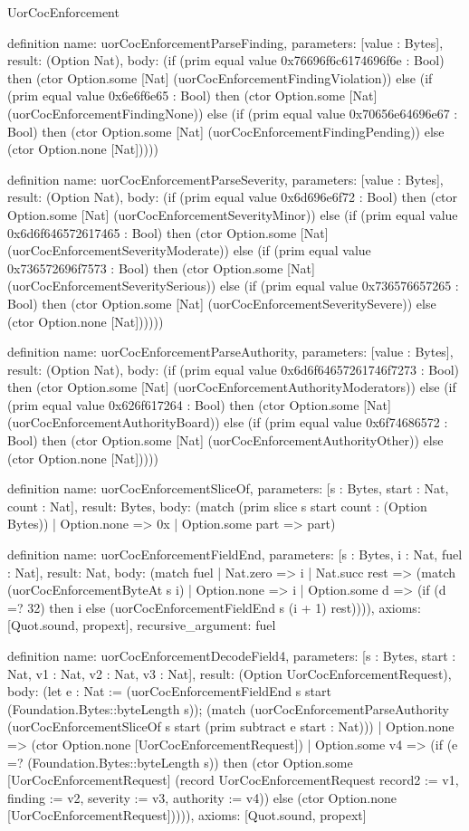 \begin{lexlean}{UorCocEnforcement}
\begin{semanticmodule}
definition{
  name: uorCocEnforcementParseFinding,
  parameters: [value : Bytes],
  result: (Option Nat),
  body: (if (prim equal value 0x76696f6c6174696f6e : Bool) then (ctor Option.some [Nat] (uorCocEnforcementFindingViolation)) else (if (prim equal value 0x6e6f6e65 : Bool) then (ctor Option.some [Nat] (uorCocEnforcementFindingNone)) else (if (prim equal value 0x70656e64696e67 : Bool) then (ctor Option.some [Nat] (uorCocEnforcementFindingPending)) else (ctor Option.none [Nat]))))
}

definition{
  name: uorCocEnforcementParseSeverity,
  parameters: [value : Bytes],
  result: (Option Nat),
  body: (if (prim equal value 0x6d696e6f72 : Bool) then (ctor Option.some [Nat] (uorCocEnforcementSeverityMinor)) else (if (prim equal value 0x6d6f646572617465 : Bool) then (ctor Option.some [Nat] (uorCocEnforcementSeverityModerate)) else (if (prim equal value 0x736572696f7573 : Bool) then (ctor Option.some [Nat] (uorCocEnforcementSeveritySerious)) else (if (prim equal value 0x736576657265 : Bool) then (ctor Option.some [Nat] (uorCocEnforcementSeveritySevere)) else (ctor Option.none [Nat])))))
}

definition{
  name: uorCocEnforcementParseAuthority,
  parameters: [value : Bytes],
  result: (Option Nat),
  body: (if (prim equal value 0x6d6f64657261746f7273 : Bool) then (ctor Option.some [Nat] (uorCocEnforcementAuthorityModerators)) else (if (prim equal value 0x626f617264 : Bool) then (ctor Option.some [Nat] (uorCocEnforcementAuthorityBoard)) else (if (prim equal value 0x6f74686572 : Bool) then (ctor Option.some [Nat] (uorCocEnforcementAuthorityOther)) else (ctor Option.none [Nat]))))
}

definition{
  name: uorCocEnforcementSliceOf,
  parameters: [s : Bytes, start : Nat, count : Nat],
  result: Bytes,
  body: (match (prim slice s start count : (Option Bytes))
    | Option.none => 0x
    | Option.some part => part)
}

definition{
  name: uorCocEnforcementFieldEnd,
  parameters: [s : Bytes, i : Nat, fuel : Nat],
  result: Nat,
  body: (match fuel
    | Nat.zero => i
    | Nat.succ rest => (match (uorCocEnforcementByteAt s i)
      | Option.none => i
      | Option.some d => (if (d =? 32) then i else (uorCocEnforcementFieldEnd s (i + 1) rest)))),
  axioms: [Quot.sound, propext],
  recursive_argument: fuel
}

definition{
  name: uorCocEnforcementDecodeField4,
  parameters: [s : Bytes, start : Nat, v1 : Nat, v2 : Nat, v3 : Nat],
  result: (Option UorCocEnforcementRequest),
  body: (let e : Nat := (uorCocEnforcementFieldEnd s start (Foundation.Bytes::byteLength s)); (match (uorCocEnforcementParseAuthority (uorCocEnforcementSliceOf s start (prim subtract e start : Nat)))
    | Option.none => (ctor Option.none [UorCocEnforcementRequest])
    | Option.some v4 => (if (e =? (Foundation.Bytes::byteLength s)) then (ctor Option.some [UorCocEnforcementRequest] (record UorCocEnforcementRequest {record2 := v1, finding := v2, severity := v3, authority := v4})) else (ctor Option.none [UorCocEnforcementRequest])))),
  axioms: [Quot.sound, propext]
}


\end{semanticmodule}
\end{lexlean}
